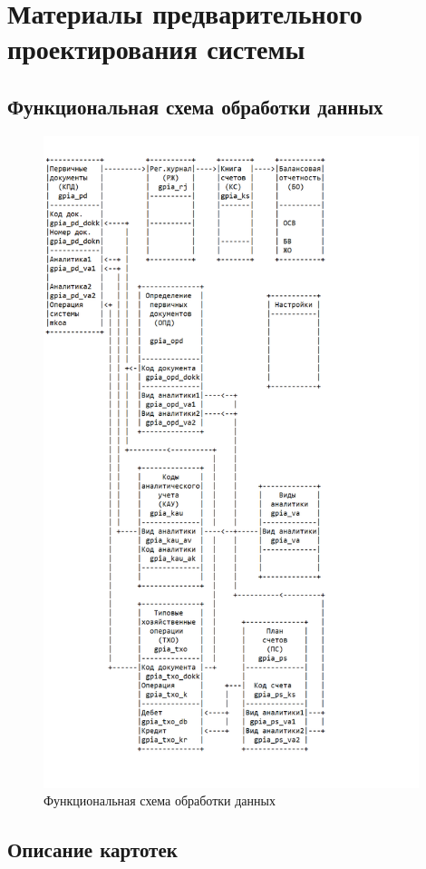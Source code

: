\section{Материалы предварительного проектирования системы}
\subsection{Функциональная схема обработки данных}

\begin{figure}[!htb]
    \centering
    \includegraphics[height=19cm]
        {_assets/gpia_part2.png}
    \caption{Функциональная схема обработки данных}
    \label{fig:gpia_part2}
\end{figure}

\subsection{Описание картотек}

